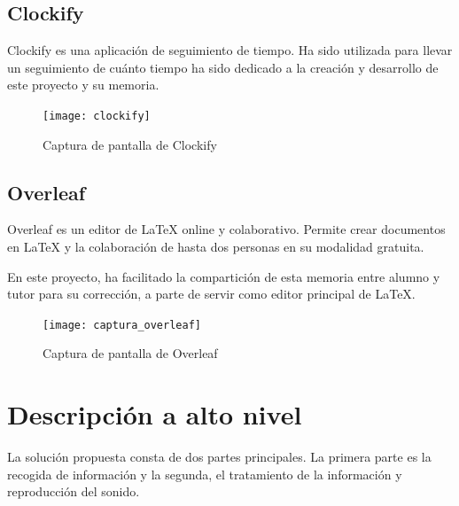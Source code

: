             \newpage


        \subsection{Clockify} %
        \label{sub:Clockify}

            Clockify es una aplicación de seguimiento de tiempo. Ha sido utilizada para llevar un seguimiento de cuánto
            tiempo ha sido dedicado a la creación y desarrollo de este proyecto y su memoria.

            \begin{figure}[ht]
                \centering
                \texttt{[image: clockify]}
                \caption{Captura de pantalla de Clockify \label{fig:ClockifyCaptura}}
            \end{figure}


        \subsection{Overleaf} %
        \label{sub:Overleaf}

            Overleaf es un editor de LaTeX online y colaborativo. Permite crear documentos en LaTeX y la colaboración de
            hasta dos personas en su modalidad gratuita.

            En este proyecto, ha facilitado la compartición de esta memoria entre alumno y tutor para su corrección, a
            parte de servir como editor principal de LaTeX.

            \begin{figure}[ht]
                \centering
                \texttt{[image: captura\_overleaf]}
                \caption{Captura de pantalla de Overleaf \label{fig:OverleafCaptura}}
            \end{figure}



    \section{Descripción a alto nivel} %
    \label{sec:DescripcionAAltoNivel}

        La solución propuesta consta de dos partes principales. La primera parte es la recogida de información y la
        segunda, el tratamiento de la información y reproducción del sonido.


